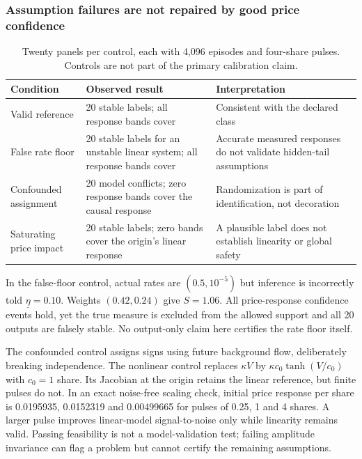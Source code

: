\documentclass[10pt,twocolumn,letterpaper]{article}
\theoremstyle{definition}
\theoremstyle{remark}
\begin{document}
\subsubsection{Assumption failures are not repaired by good price confidence}
\begin{table}[htbp]
\centering\small
\caption{Twenty panels per control, each with 4,096 episodes and four-share pulses. Controls are not part of the primary calibration claim.}
\label{tab:observable_failures}
\begin{tabularx}{\textwidth}{p{}YY}\toprule
Condition & Observed result & Interpretation\\\midrule
Valid reference & 20 stable labels; all response bands cover & Consistent with the declared class\\
False rate floor & 20 stable labels for an unstable linear system; all response bands cover & Accurate measured responses do not validate hidden-tail assumptions\\
Confounded assignment & 20 model conflicts; zero response bands cover the causal response & Randomization is part of identification, not decoration\\
Saturating price impact & 20 stable labels; zero bands cover the origin's linear response & A plausible label does not establish linearity or global safety\\\bottomrule
\end{tabularx}
\end{table}

In the false-floor control, actual rates are $(0.5,10^{-5})$ but inference is incorrectly told $\underline\eta=0.10$. Weights $(0.42,0.24)$ give $S=1.06$. All price-response confidence events hold, yet the true measure is excluded from the allowed support and all 20 outputs are falsely stable. No output-only claim here certifies the rate floor itself.

The confounded control assigns signs using future background flow, deliberately breaking independence. The nonlinear control replaces $\kappa V$ by $\kappa c_0\tanh(V/c_0)$ with $c_0=1$ share. Its Jacobian at the origin retains the linear reference, but finite pulses do not. In an exact noise-free scaling check, initial price response per share is 0.0195935, 0.0152319 and 0.00499665 for pulses of 0.25, 1 and 4 shares. A larger pulse improves linear-model signal-to-noise only while linearity remains valid. Passing feasibility is not a model-validation test; failing amplitude invariance can flag a problem but cannot certify the remaining assumptions.
\end{document}
